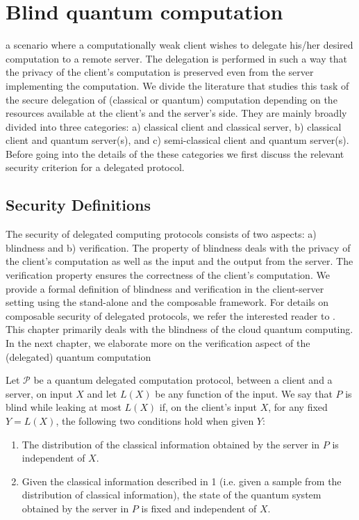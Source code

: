 %
%


\section{Blind quantum computation} \label{sec:blind} 


 a scenario where a computationally weak client wishes to delegate his/her desired computation to a remote server. The delegation is performed in such a way that the privacy of the client's computation is preserved even from the server implementing the computation. We divide the literature that studies this task of the secure delegation of (classical or quantum) computation depending on the resources available at the client's and the server's side. They are mainly broadly divided into three categories: a) classical client and classical server, b) classical client and quantum server(s), and c) semi-classical client and quantum server(s). Before going into the details of the these categories we first discuss the relevant security criterion for a delegated protocol. 
\subsection{Security Definitions}
The security of delegated computing protocols consists of two aspects: a) blindness and b) verification. The property of blindness deals with the privacy of the client's computation as well as the input and the output from the server. The verification property ensures the correctness of the client's computation. We provide a formal definition of blindness and verification in the client-server setting using the stand-alone and the composable framework. For details on composable security of delegated protocols, we refer the interested reader to \cite{dunjko2014composable}. This chapter primarily deals with the blindness of the cloud quantum computing. In the next chapter, we elaborate more on the verification aspect of the (delegated) quantum computation 

\begin{definition}
\label{def:secbqc}
Let $\mathcal{P}$ be a quantum delegated computation protocol, between a client and a server, on input $X$ and let $L(X)$ be any function of the input. We say that $P$ is blind while leaking at most $L(X)$ if, on the client's input
$X$, for any  fixed $Y = L(X)$, the following two conditions hold when given $Y$:
\begin{enumerate}
\item The distribution of the classical information obtained by the server in $P$ is independent of $X$.
\item Given the classical information described in 1 (i.e. given a sample from the distribution of classical information), the state of the quantum system obtained by the server in $P$ is fixed and independent of $X$.
\end{enumerate}
\end{definition}


